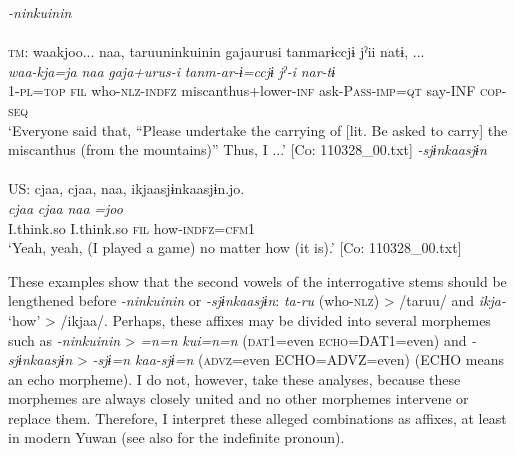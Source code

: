 \ea  \label{ex:4.55}
\ea  \textit{{}-ninkuinin} \label{ex:4.55a}\\\\
    \textsc{tm}:
     \glll waakjoo...  naa,  taruuninkuinin  gajaurusi   tanmarɨccjɨ  jˀii  natɨ, ...\\
      \textit{waa-kja=ja}  \textit{naa}  \textit{}  \textit{gaja+urus-i} \textit{tanm-ar-ɨ=ccjɨ}  \textit{jˀ-i}  \textit{nar-tɨ}\\                                                                                        
      1-\textsc{pl}=\textsc{top}  \textsc{fil}  who-\textsc{nlz}-\textsc{indfz}  miscanthus+lower-\textsc{inf}                                ask-P\textsc{ass}-\textsc{imp}=\textsc{qt}  say-INF  \textsc{cop}-\textsc{seq}\\
      \glt ‘Everyone said that, “Please undertake the carrying of [lit. Be asked to carry] the miscanthus (from the mountains)” Thus, I ...’   [Co: 110328\_00.txt]
\ex  \textit{{}-sjɨnkaasjɨn}\\\\
US: \glll     cjaa,  cjaa,  naa,  ikjaasjɨnkaasjɨn.jo.\\
      \textit{cjaa}  \textit{cjaa}  \textit{naa}  \textit{=joo}\\
      I.think.so  I.think.so  \textsc{fil}  how-\textsc{indfz}=\textsc{cfm}1\\
      \glt       ‘Yeah, yeah, (I played a game) no matter how (it is).’ [Co: 110328\_00.txt]
    \z
\z

These examples show that the second vowels of the interrogative stems should be lengthened before \textit{{}-ninkuinin} or \textit{{}-sjɨnkaasjɨn}: \textit{ta-ru} (who-\textsc{nlz}) > /taruu/ and \textit{ikja-} ‘how’ > /ikjaa/. Perhaps, these affixes may be divided into several morphemes such as \textit{{}-ninkuinin} > \textit{=n=n} \textit{kui=n=n} (\textsc{dat}1=even \textsc{echo}=DAT1=even) and \textit{{}-sjɨnkaasjɨn} > \textit{{}-sjɨ=n kaa-sjɨ=n} (\textsc{advz}=even ECHO=ADVZ=even) (ECHO means an echo morpheme). I do not, however, take these analyses, because these morphemes are always closely united and no other morphemes intervene or replace them. Therefore, I interpret these alleged combinations as affixes, at least in modern Yuwan (see also  for the indefinite pronoun).

